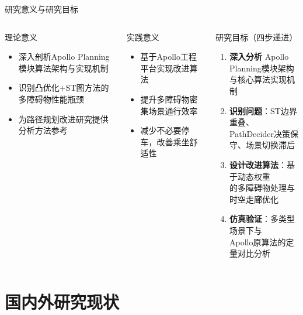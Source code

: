 \documentclass{beamer}
\begin{document}
\begin{frame}{研究意义与研究目标}
  \begin{columns}[T]
    \begin{block}{理论意义}
      \begin{itemize}
        \item 深入剖析Apollo Planning模块算法架构与实现机制
        \item 识别凸优化$+$ST图方法的多障碍物性能瓶颈
        \item 为路径规划改进研究提供分析方法参考
      \end{itemize}
    \end{block}
    \vspace{0.3em}
    \begin{block}{实践意义}
      \begin{itemize}
        \item 基于Apollo工程平台实现改进算法
        \item 提升多障碍物密集场景通行效率
        \item 减少不必要停车，改善乘坐舒适性
      \end{itemize}
    \end{block}

    \begin{exampleblock}{研究目标（四步递进）}
      \begin{enumerate}
        \item \textbf{深入分析} Apollo Planning模块架构\\
              与核心算法实现机制
        \item \textbf{识别问题}：ST边界重叠、\\
              PathDecider决策保守、场景切换滞后
        \item \textbf{设计改进算法}：基于动态权重\\
              的多障碍物处理与时空走廊优化
        \item \textbf{仿真验证}：多类型场景下与\\
              Apollo原算法的定量对比分析
      \end{enumerate}
    \end{exampleblock}
  \end{columns}
\end{frame}

\section{国内外研究现状}
\end{document}

